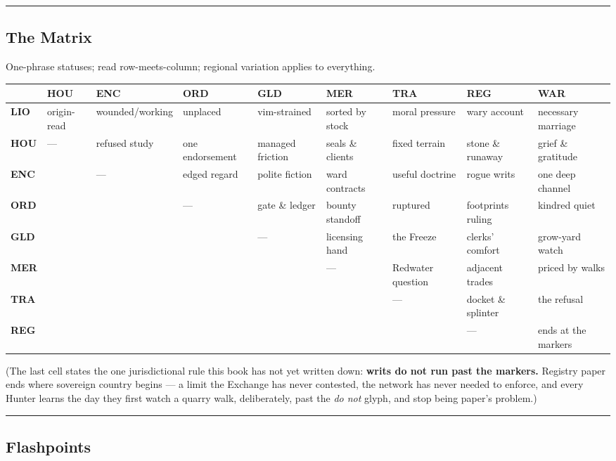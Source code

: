\medskip\hrule\medskip

\subsection{The Matrix}

One-phrase statuses; read row-meets-column; regional variation applies to everything.

\begin{center}
\small
\begin{tabular}{l|llllllll}
 & \textbf{HOU} & \textbf{ENC} & \textbf{ORD} & \textbf{GLD} & \textbf{MER} & \textbf{TRA} & \textbf{REG} & \textbf{WAR} \\
\hline
\textbf{LIO} & origin-read & wounded/working & unplaced & vim-strained & sorted by stock & moral pressure & wary account & necessary marriage \\
\textbf{HOU} & --- & refused study & one endorsement & managed friction & seals \& clients & fixed terrain & stone \& runaway & grief \& gratitude \\
\textbf{ENC} & & --- & edged regard & polite fiction & ward contracts & useful doctrine & rogue writs & one deep channel \\
\textbf{ORD} & & & --- & gate \& ledger & bounty standoff & ruptured & footprints ruling & kindred quiet \\
\textbf{GLD} & & & & --- & licensing hand & the Freeze & clerks' comfort & grow-yard watch \\
\textbf{MER} & & & & & --- & Redwater question & adjacent trades & priced by walks \\
\textbf{TRA} & & & & & & --- & docket \& splinter & the refusal \\
\textbf{REG} & & & & & & & --- & ends at the markers \\
\end{tabular}
\end{center}

(The last cell states the one jurisdictional rule this book has not yet written down: \textbf{writs do not run past the markers.} Registry paper ends where sovereign country begins --- a limit the Exchange has never contested, the network has never needed to enforce, and every Hunter learns the day they first watch a quarry walk, deliberately, past the \textit{do not} glyph, and stop being paper's problem.)

\medskip\hrule\medskip

\subsection{Flashpoints}

